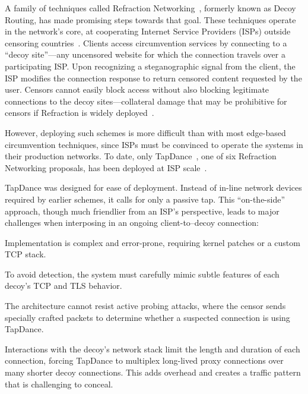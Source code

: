 \documentclass[sigconf,anonymous]{acmart}
\begin{document}
A family of techniques called Refraction Networking~\cite{telex11,cirripede11,curveball11,tapdance14,rebound15,slitheen16,waterfall17}, formerly known
as Decoy Routing, has made promising steps towards that goal.
These techniques operate in the network's core, at cooperating Internet Service Providers
(ISPs) outside censoring countries~\cite{refraction-site}.  Clients access circumvention services by connecting to a ``decoy site''---any uncensored website for which the connection travels over a participating ISP\@.  Upon recognizing a steganographic signal from the client, the ISP modifies the connection response to return censored content requested by the user.
Censors cannot easily block access without also blocking legitimate connections to the decoy sites---collateral damage that may be prohibitive for censors if Refraction is widely deployed~\cite{robinson2013collateral}.

However, deploying such schemes is more difficult than with most
edge-based circumvention techniques, since ISPs must be convinced to
operate the systems in their production networks.  To date, only
TapDance~\cite{tapdance14}, one of six Refraction Networking
proposals, has been deployed at ISP scale~\cite{frolov2017isp}.

TapDance was designed for ease of deployment.
Instead of in-line network devices required by earlier schemes, it
calls for only a passive tap.
This ``on-the-side'' approach, though much friendlier from an ISP's
perspective, leads to major challenges when interposing in an ongoing
client-to--decoy connection:
\begin{compactitem}
\item Implementation is complex and error-prone, requiring kernel
  patches or a custom TCP stack.
\item To avoid detection, the system must carefully mimic
  subtle features of each decoy's TCP and TLS behavior.
\item The architecture cannot resist active probing attacks, where the
  censor sends specially crafted packets to determine whether a
  suspected connection is using TapDance.
\item Interactions with the decoy's network stack limit the length and
  duration of each connection, forcing TapDance to multiplex
  long-lived proxy connections over many shorter decoy
  connections. This adds overhead and creates a traffic pattern
  that is challenging to conceal.
\end{compactitem}
\end{document}
